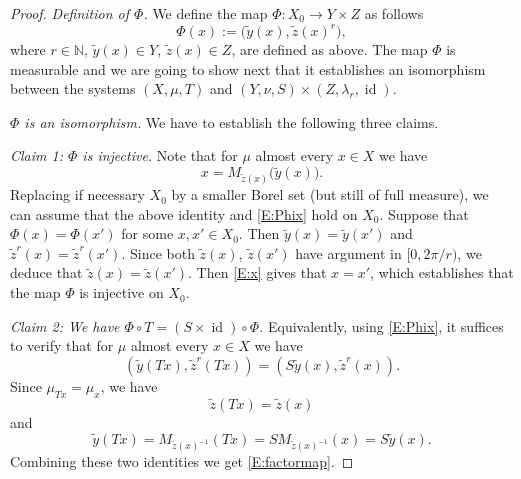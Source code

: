 \documentclass[11pt]{amsart}
\theoremstyle{definition}
\newcommand{\N}{{\mathbb N}}
\DeclareMathOperator{\id}{id}
\begin{document}
\begin{proof}
	
	\smallskip
	
	{\em Definition of  $\Phi$.}  We define the map $\Phi\colon X_0\to Y\times Z$ as follows
	\begin{equation}\label{E:Phix}
		\Phi(x):=\bigl(\tilde{y}(x),\tilde{z}(x)^r\bigr),
	\end{equation}
	where $r\in \N$, $\tilde{y}(x)\in Y$,  $\tilde{z}(x)\in Z$, are  defined as above. The map $\Phi$ is measurable and we are going to show next that it establishes an isomorphism between the systems $(X,\mu,T)$ and $(Y,\nu,S)\times(Z,\lambda_r,\id)$.
	
	\smallskip
	
	
	
	{\em $\Phi$ is an isomorphism.}  We have to establish the following three claims.
	
	\smallskip
	
	{\em Claim 1: $\Phi$ is injective.}
	Note that for $\mu$ almost every $x\in X$ we have
	\begin{equation}\label{E:x}
		x=M_{\tilde z(x)}\bigl(\tilde y(x)\bigr).
	\end{equation}
	Replacing if necessary $X_0$ by a smaller Borel set (but still of full measure), we can assume that the above identity and \eqref{E:Phix} hold on $X_0$. Suppose that $\Phi(x)=\Phi(x')$ for some $x,x'\in X_0$.
	Then $\tilde{y}(x)=\tilde{y}(x')$ and $\tilde{z}^r(x)=\tilde{z}^r(x')$. Since both
	$\tilde{z}(x)$, $\tilde{z}(x')$ have argument in $[0,2\pi/r)$, we deduce that $\tilde{z}(x)=\tilde{z}(x')$.
	Then   \eqref{E:x} gives that $x=x'$, which  establishes that the map $\Phi$ is injective on $X_0$.
	
	
	
	\smallskip
	
	{\em Claim 2: We have $\Phi\circ T=(S\times \id)\circ\Phi$.}
	Equivalently, using \eqref{E:Phix}, it suffices to verify that for $\mu$ almost every $x\in X$ we have
	\begin{equation}\label{E:factormap}
		(\tilde{y}(Tx),\tilde{z}^r(Tx))=
		(S\tilde{y}(x), \tilde{z}^r(x)).
	\end{equation}
	Since  $\mu_{Tx}=\mu_x$, we have
	$$
	\tilde z(Tx)=\tilde z(x)
	$$
	and
	$$
	\tilde y(Tx)=M_{\tilde z(x)^{-1}} (Tx)=SM_{\tilde z(x)^{-1}} (x)=S\tilde y(x).
	$$
	Combining these two identities we get \eqref{E:factormap}.
	
	\smallskip
	

\end{proof}
\end{document}
